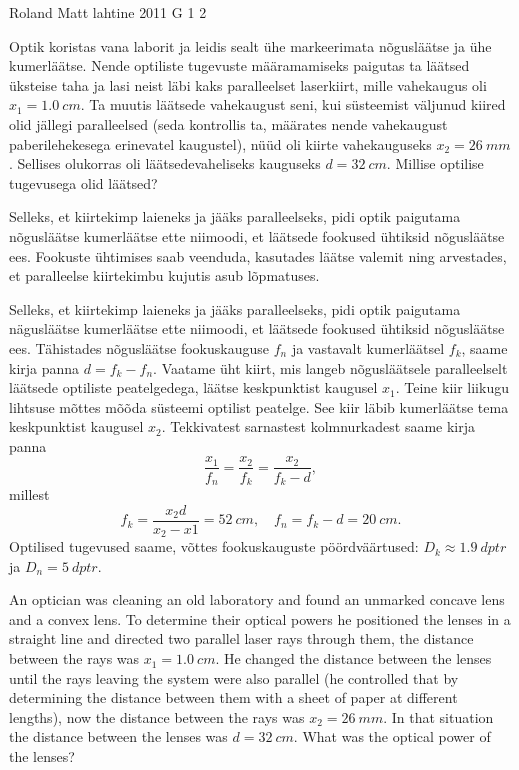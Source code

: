 {Roland Matt} %
{lahtine} %
{2011} %
{G 1} %
{2} %
{
\ifStatement
Optik koristas vana laborit ja leidis sealt ühe markeerimata nõgusläätse ja ühe
kumerläätse. Nende optiliste tugevuste määramamiseks paigutas ta läätsed
üksteise taha ja lasi neist läbi kaks paralleelset laserkiirt, mille vahekaugus
oli $x_{1}=\SI{1,0}{cm}$. Ta muutis läätsede vahekaugust seni, kui süsteemist väljunud
kiired olid jällegi paralleelsed (seda kontrollis ta, määrates nende vahekaugust
paberilehekesega erinevatel kaugustel), nüüd oli kiirte vahekauguseks
$x_{2}=\SI{26}{mm}$. Sellises olukorras oli läätsedevaheliseks kauguseks 
$d=\SI{32}{cm}$.
Millise optilise tugevusega olid läätsed?
\fi


\ifHint
Selleks, et kiirtekimp laieneks ja jääks paralleelseks, pidi optik paigutama
nõgusläätse kumerläätse ette niimoodi, et läätsede fookused ühtiksid nõgusläätse
ees. Fookuste ühtimises saab veenduda, kasutades läätse valemit ning arvestades, et paralleelse kiirtekimbu kujutis asub lõpmatuses.
\fi


\ifSolution
Selleks, et kiirtekimp laieneks ja jääks paralleelseks, pidi optik paigutama
nägusläätse kumerläätse ette niimoodi, et läätsede fookused ühtiksid nõgusläätse
ees. Tähistades nõgusläätse fookuskauguse $f_{n}$ ja vastavalt kumerläätsel
$f_{k}$, saame kirja panna $d=f_{k}-f_{n}$. Vaatame üht kiirt, mis langeb
nõgusläätsele paralleelselt läätsede optiliste peatelgedega, läätse keskpunktist
kaugusel $x_{1}$. Teine kiir liikugu lihtsuse mõttes mõõda süsteemi optilist
peatelge. See kiir läbib kumerläätse tema keskpunktist kaugusel $x_{2}$.
Tekkivatest sarnastest kolmnurkadest saame kirja panna
\[ \frac{x_{1}}{f_{n}}=\frac{x_{2}}{f_{k}}=\frac{x_{2}}{f_{k}-d}, \] millest
\[ f_{k}=\frac{x_{2}d}{x_{2}-x{1}}=\SI{52}{cm},\quad  f_{n}=f_{k}-d=\SI{20}{cm}.\]
Optilised tugevused saame, võttes fookuskauguste pöördväärtused:
$D_{k}\approx\SI{1,9}{dptr}$ ja $D_{n}=\SI{5}{dptr}$.
\fi


\ifEngStatement
An optician was cleaning an old laboratory and found an unmarked concave lens and a convex lens. To determine their optical powers he positioned the lenses in a straight line and directed two parallel laser rays through them, the distance between the rays was $x_{1}=\SI{1,0}{cm}$. He changed the distance between the lenses until the rays leaving the system were also parallel (he controlled that by determining the distance between them with a sheet of paper at different lengths), now the distance between the rays was $x_{2}=\SI{26}{mm}$. In that situation the distance between the lenses was $d=\SI{32}{cm}$. What was the optical power of the lenses?
\fi


}

